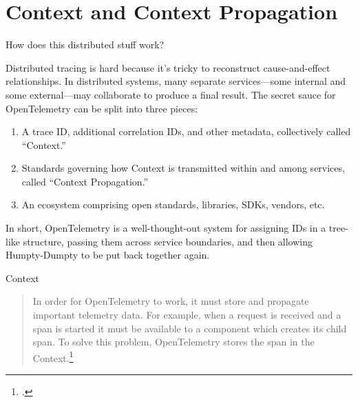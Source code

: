 \documentclass[aspectratio=169]{beamer}
\begin{document}
\section{Context and Context Propagation}

\begin{frame}{How does this distributed stuff work?}

  Distributed tracing is hard because it's tricky to reconstruct
  cause-and-effect relationships. In distributed systems, many separate
  services---some internal and some external---may collaborate to produce a
  final result. The secret sauce for OpenTelemetry can be split into three
  pieces:

  \begin{enumerate}
    \item A trace ID, additional correlation IDs, and other metadata,
          collectively called ``Context.''
    \item Standards governing how Context is transmitted within and among
          services, called ``Context Propagation.''
    \item An ecosystem comprising open standards, libraries, SDKs, vendors, etc.
  \end{enumerate}

  \vspace{1em}

  In short, OpenTelemetry is a well-thought-out system for assigning IDs in a
  tree-like structure, passing them across service boundaries, and then allowing
  Humpty-Dumpty to be put back together again.

\end{frame}

\begin{frame}{Context}
  \begin{quote}

    In order for OpenTelemetry to work, it must store and propagate important
    telemetry data. For example, when a request is received and a span is
    started it must be available to a component which creates its child span. To
    solve this problem, OpenTelemetry stores the span in the
    Context.\footcite{otel-context-js}

  \end{quote}
\end{frame}
\end{document}

